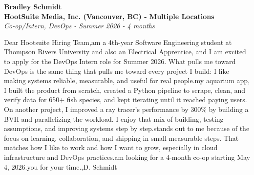 \documentclass[11pt]{article}
\begin{document}
\textbf{Bradley Schmidt}\\
\vspace{0.5em}
\textbf{HootSuite Media, Inc. (Vancouver, BC) - Multiple Locations}\\
\textit{Co-op/Intern, DevOps - Summer 2026 - 4 months}

Dear Hootsuite Hiring Team,\n\nI am a 4th-year Software Engineering student at Thompson Rivers University and also an Electrical Apprentice, and I am excited to apply for the DevOps Intern role for Summer 2026. What pulls me toward DevOps is the same thing that pulls me toward every project I build: I like making systems reliable, measurable, and useful for real people.\n\nOn my aquarium app, I built the product from scratch, created a Python pipeline to scrape, clean, and verify data for 650+ fish species, and kept iterating until it reached paying users. On another project, I improved a ray tracer's performance by 300\% by building a BVH and parallelizing the workload. I enjoy that mix of building, testing assumptions, and improving systems step by step.\n\nHootsuite stands out to me because of the focus on learning, collaboration, and shipping in small measurable steps. That matches how I like to work and how I want to grow, especially in cloud infrastructure and DevOps practices.\n\nI am looking for a 4-month co-op starting May 4, 2026.\n\nThank you for your time.\n\nSincerely,\nBradley D. Schmidt
\end{document}
